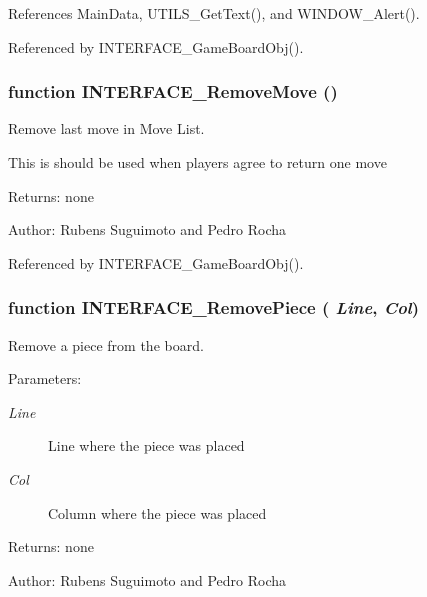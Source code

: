 References MainData, UTILS\_\-GetText(), and WINDOW\_\-Alert().

Referenced by INTERFACE\_\-GameBoardObj().
\subsubsection[INTERFACE\_\-RemoveMove]{\setlength{\rightskip}{0pt plus 5cm}function INTERFACE\_\-RemoveMove ()}\label{interface_2game_8js_d6dab7ab9952d6f7444e54241251036b}


Remove last move in Move List. 

This is should be used when players agree to return one move

\begin{Desc}
\item[Returns:]none \end{Desc}
\begin{Desc}
\item[Author:]Rubens Suguimoto and Pedro Rocha \end{Desc}


Referenced by INTERFACE\_\-GameBoardObj().
\subsubsection[INTERFACE\_\-RemovePiece]{\setlength{\rightskip}{0pt plus 5cm}function INTERFACE\_\-RemovePiece ( {\em Line}, \/   {\em Col})}\label{interface_2game_8js_da39321a30800e290630e200f02cf82c}


Remove a piece from the board. 

\begin{Desc}
\item[Parameters:]
\begin{description}
\item[{\em Line}]Line where the piece was placed \item[{\em Col}]Column where the piece was placed \end{description}
\end{Desc}
\begin{Desc}
\item[Returns:]none \end{Desc}
\begin{Desc}
\item[Author:]Rubens Suguimoto and Pedro Rocha \end{Desc}



